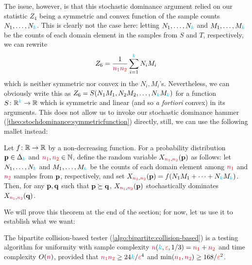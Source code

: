 The issue, however, is that this stochastic dominance argument relied on our statistic $Z_4$ being a symmetric and convex function of the sample counts $N_1,\dots, N_\ab$. This is clearly not the case here: letting $N_1,\dots,N_\ab$ and $M_1,\dots,M_\ab$ be the counts of each domain element in the samples from $S$ and $T$, respectively, we can rewrite
\begin{equation}
    Z_6 = \frac{1}{\nss\nst}\sum_{i=1}^\ab N_i M_i
\end{equation}
which is neither symmetric nor convex in the $N_i,M_i$'s. Nevertheless, we can obviously write this as $Z_6 = S(N_1M_1,N_2M_2,\dots,N_\ab M_\ab)$ for a function $S\colon\R^\ab\to\R$ which is symmetric and linear (and so \textit{a fortiori} convex) in its arguments. This does not allow us to invoke our stochastic dominance hammer (\cref{theo:stochdominance:symmetricfunction}) directly, still, we can use the following mallet instead:
\begin{theorem}
  \label{theo:stochdominance:symmetricfunction:variant}
  Let $f\colon \R\to\R$ by a non-decreasing function. For a probability distribution $\p\in\distribs{\ab}$ and $\nss,\nst\in\N$, define the random variable $X_{\nss,\nst}(\p)$ as follows: let $N_1,\dots,N_\ab$ and $M_1,\dots,M_\ab$ be the counts of each domain element among $\nss$ and $\nst$ \iid samples from $\p$, respectively, and set $X_{\nss,\nst}(\p)=f(N_1M_1+\dots+N_\ab M_\ab)$. Then, for any $\p,\q$ such that $\p\succeq\q$, $X_{\nss,\nst}(\p)$ stochastically dominates $X_{\nss,\nst}(\q)$.
\end{theorem}
We will prove this theorem at the end of the section; for now, let us use it to establish what we want:
\begin{theorem}
  \label{theo:bipartite:collision-based}
The bipartite collision-based tester (\cref{algo:bipartite:collision-based}) is a testing algorithm for uniformity with sample complexity $\ns(\ab,\dst,1/3) = \nss+\nst$ and time complexity $O(\ns)$, provided that $\nss\nst \geq 24\ab/\dst^4$ and $\min(\nss,\nst)\geq 168/\dst^2$.
\end{theorem}
